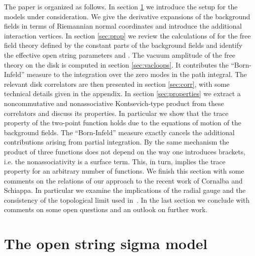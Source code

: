 \documentclass[a4paper,12pt]{article}
\begin{document}
The paper is organized as follows.
In section \ref{sec:model} we introduce the setup for the models
under consideration. We give the derivative expansions of 
the background fields in terms of Riemannian normal coordinates and 
introduce the additional interaction vertices. In section \ref{sec:prop} 
we review the calculations of \cite{Schomerus:1999ug} for the free field 
theory defined by the constant parts of the background 
fields and identify the effective open string parameters \coordHE{} and \myHighlight{$\Theta$}\coordHE{}. 
The vacuum amplitude of the free theory on the disk is computed in section 
\ref{sec:vacloops}. It contributes the ``Born-Infeld'' measure to the 
integration over the zero modes in the path integral. 
The relevant disk correlators are then presented in section \ref{sec:corr},
with some technical details given in the appendix. 
In section \ref{sec:properties} we extract 
a noncommutative and nonassociative Kontsevich-type product from these
correlators and discuss its properties. 
In particular we show that the trace property of the two-point function 
holds due to the equations of motion of the background fields. 
The ``Born-Infeld'' measure exactly cancels the additional contributions 
arising from partial integration. By the same mechanism the product of 
three functions does not depend on the way one introduces brackets, i.e. 
the nonassociativity is a surface term. This, in turn, implies the trace 
property for an arbitrary number of functions. We finish this section with 
some comments on the relations of our approach to the recent work of 
Cornalba and Schiappa. In particular we examine the implications of the 
radial gauge and the consistency of the topological limit used 
in~\cite{Cornalba:2001sm}. In the last section we
conclude with comments on some open questions and an outlook on further work.

\section{The open string sigma model}
\label{sec:model}
\end{document}
